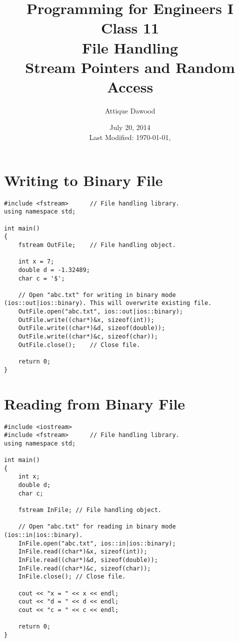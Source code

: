 \documentclass[12pt,a4paper]{article}
\title{\vspace{-2cm}Programming for Engineers I\\Class 11\\File Handling\\Stream Pointers and Random Access}
\author{Attique Dawood}
\date{July 20, 2014\\[0.2cm] Last Modified: \today, \currenttime}
\begin{document}
\maketitle
\section{Writing to Binary File}
\begin{lstlisting}[caption={Writing to binary file}]
#include <fstream>		// File handling library.
using namespace std;

int main()
{
	fstream OutFile;	// File handling object.

	int x = 7;
	double d = -1.32489;
	char c = '$';

	// Open "abc.txt" for writing in binary mode (ios::out|ios::binary). This will overwrite existing file.
	OutFile.open("abc.txt", ios::out|ios::binary);
	OutFile.write((char*)&x, sizeof(int));
	OutFile.write((char*)&d, sizeof(double));
	OutFile.write((char*)&c, sizeof(char));
	OutFile.close();	// Close file.

	return 0;
}
\end{lstlisting}
\section{Reading from Binary File}
\begin{lstlisting}[caption={Reading from Binary file}]
#include <iostream>
#include <fstream>		// File handling library.
using namespace std;

int main()
{
	int x;
	double d;
	char c;

	fstream InFile;	// File handling object.

	// Open "abc.txt" for reading in binary mode (ios::in|ios::binary).
	InFile.open("abc.txt", ios::in|ios::binary);
	InFile.read((char*)&x, sizeof(int));
	InFile.read((char*)&d, sizeof(double));
	InFile.read((char*)&c, sizeof(char));
	InFile.close();	// Close file.

	cout << "x = " << x << endl;
	cout << "d = " << d << endl;
	cout << "c = " << c << endl;

	return 0;
}
\end{lstlisting}
\end{document}
